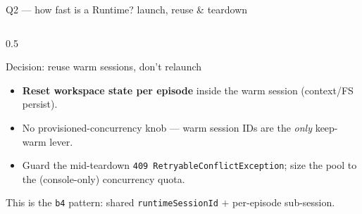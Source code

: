 \documentclass[aspectratio=169]{beamer}
\begin{document}
\begin{frame}{Q2 --- how fast is a Runtime? launch, reuse \& teardown}
\begin{columns}[T]
\begin{column}{0.5\textwidth}
\begin{block}{Decision: reuse warm sessions, don't relaunch}
\begin{itemize}
            timer $\Rightarrow$ stays warm within max-lifetime.
          \item \textbf{Reset workspace state per episode} inside the warm session (context/FS persist).
          \item No provisioned-concurrency knob --- warm session IDs are the \emph{only} keep-warm lever.
          \item Guard the mid-teardown \texttt{409 RetryableConflictException}; size the pool to the
            (console-only) concurrency quota.
        \end{itemize}
      \end{block}
      {\scriptsize This is the \texttt{b4} pattern: shared \texttt{runtimeSessionId} $+$ per-episode sub-session.}
    \end{column}
  \end{columns}
\end{frame}
\end{document}
